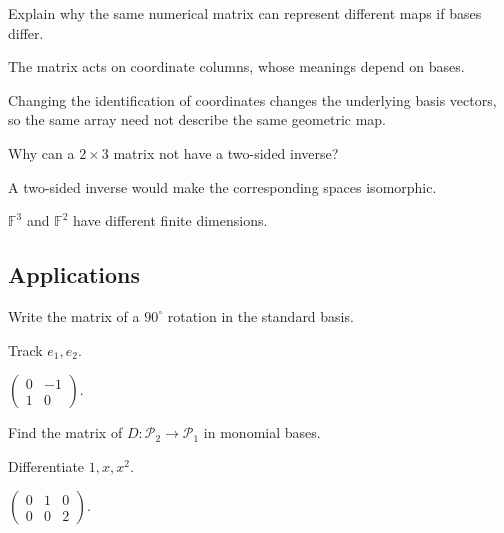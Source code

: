 \begin{exercise}\label{exr:i07-expand-11}
Explain why the same numerical matrix can represent different maps if bases differ.
\end{exercise}
\begin{hint}
The matrix acts on coordinate columns, whose meanings depend on bases.
\end{hint}
\begin{solution}
Changing the identification of coordinates changes the underlying basis vectors, so the same array need not describe the same geometric map.
\end{solution}

\begin{exercise}\label{exr:i07-expand-12}
Why can a \(2\times3\) matrix not have a two-sided inverse?
\end{exercise}
\begin{hint}
A two-sided inverse would make the corresponding spaces isomorphic.
\end{hint}
\begin{solution}
\(\mathbb F^3\) and \(\mathbb F^2\) have different finite dimensions.
\end{solution}

\subsection*{Applications}

\begin{exercise}\label{exr:i07-expand-13}
Write the matrix of a \(90^\circ\) rotation in the standard basis.
\end{exercise}
\begin{hint}
Track \(e_1,e_2\).
\end{hint}
\begin{solution}
\(\begin{pmatrix}0&-1\\1&0\end{pmatrix}\).
\end{solution}

\begin{exercise}\label{exr:i07-expand-14}
Find the matrix of \(D:\mathcal P_2\to\mathcal P_1\) in monomial bases.
\end{exercise}
\begin{hint}
Differentiate \(1,x,x^2\).
\end{hint}
\begin{solution}
\(\begin{pmatrix}0&1&0\\0&0&2\end{pmatrix}\).
\end{solution}

